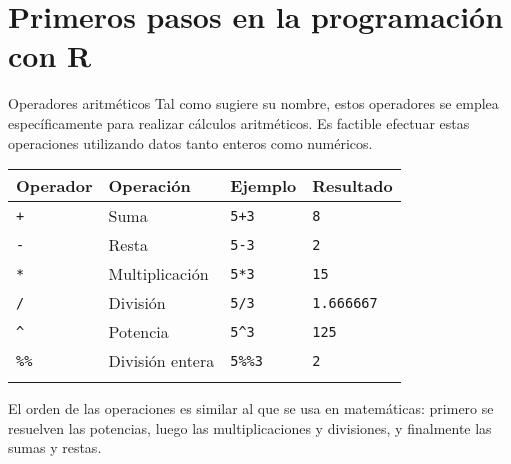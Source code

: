\documentclass[
  ignorenonframetext,
]{beamer}
\begin{document}
\section{Primeros pasos en la programación con
R}\label{primeros-pasos-en-la-programaciuxf3n-con-r}

\begin{frame}[fragile]{Operadores aritméticos}
\label{operadores-aritmuxe9ticos}
Tal como sugiere su nombre, estos operadores se emplea específicamente
para realizar cálculos aritméticos. Es factible efectuar estas
operaciones utilizando datos tanto enteros como numéricos.

\begin{longtable}[]{@{}llll@{}}
\toprule\noalign{}
Operador & Operación & Ejemplo & Resultado \\
\midrule\noalign{}
\endhead
\texttt{+} & Suma & \texttt{5+3} & \texttt{8} \\
\texttt{-} & Resta & \texttt{5-3} & \texttt{2} \\
\texttt{*} & Multiplicación & \texttt{5*3} & \texttt{15} \\
\texttt{/} & División & \texttt{5/3} & \texttt{1.666667} \\
\texttt{\^{}} & Potencia & \texttt{5\^{}3} & \texttt{125} \\
\texttt{\%\%} & División entera & \texttt{5\%\%3} & \texttt{2} \\
\bottomrule\noalign{}
\end{longtable}

El orden de las operaciones es similar al que se usa en matemáticas:
primero se resuelven las potencias, luego las multiplicaciones y
divisiones, y finalmente las sumas y restas.
\end{frame}
\end{document}
